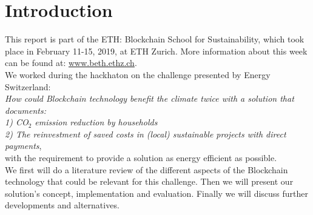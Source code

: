\documentclass[11pt]{article}
\begin{document}
\section{Introduction}
This report is part of the ETH: Blockchain School for Sustainability, which took place in February 11-15, 2019, at ETH Zurich. More information about this week can be found at: \hyperref[www.beth.ethz.ch]{www.beth.ethz.ch}.\\
We worked during the hackhaton on the challenge presented by Energy Switzerland:\\ \textit{How could Blockchain technology benefit the climate twice with a solution that documents:\\
1) CO$_2$ emission reduction by households\\
2) The reinvestment of saved costs in (local) sustainable projects with direct payments},\\
with the requirement to provide a solution as energy efficient as possible.\\
We first will do a literature review of the different aspects of the Blockchain technology that could be relevant for this challenge. Then we will present our solution's concept, implementation and evaluation. Finally we will discuss further developments and alternatives.\\
\end{document}
